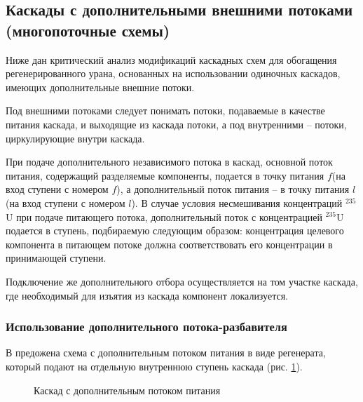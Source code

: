 \subsection{Каскады с дополнительными внешними потоками (многопоточные схемы)}

Ниже дан критический анализ модификаций каскадных схем для обогащения регенерированного урана, основанных на использовании одиночных каскадов, имеющих дополнительные внешние потоки.

Под внешними потоками следует понимать потоки, подаваемые в качестве питания каскада, и выходящие из каскада потоки, а под внутренними -- потоки, циркулирующие внутри каскада. 

При подаче дополнительного независимого потока в каскад, основной поток питания, содержащий разделяемые компоненты, подается в точку питания $f$(на вход ступени с номером $f$), а дополнительный поток питания -- в точку питания $l$ (на вход ступени с номером $l$). В случае условия несмешивания концентраций $^{235}$U при подаче питающего потока, дополнительный поток с концентрацией $^{235}$U подается в ступень, подбираемую следующим образом: концентрация целевого компонента в питающем потоке должна соответствовать его концентрации в принимающей ступени.

Подключение же дополнительного отбора осуществляется на том участке каскада, где необходимый для изъятия из каскада компонент локализуется.

\subsubsection{Использование дополнительного потока-разбавителя}

В \cite{sulaberidzeQuasiidealCascadesAdditional2006} предожена схема с дополнительным потоком питания в виде регенерата, который подают на отдельную внутреннюю ступень каскада (рис. \ref{fig:2_inputs}).
\begin{figure}[ht]
  \caption{Каскад с дополнительным потоком питания}\label{fig:2_inputs}
\end{figure}

